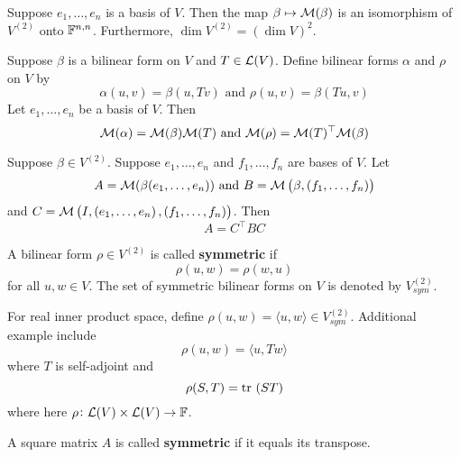 \documentclass{extarticle}
\begin{document}
\begin{corollary}[\(\dim V^{(2)} = \left( \dim V \right)^2\)]
    Suppose \(e_1, \ldots, e_n\) is a basis of \(V\). Then the map \(\beta \mapsto \mathcal{M}(\beta)\) is an 
    isomorphism of \(V^{(2)}\) onto \(\mathbb{F}^{n, n}\). Furthermore, \(\dim V^{(2)} = (\dim V)^2\). 
\end{corollary}

\begin{lemma}
    Suppose \(\beta\) is a bilinear form on \(V\) and \(T \in \mathcal{L}(V)\). Define bilinear forms 
    \(\alpha\) and \(\rho\) on \(V\) by 
    \[\alpha(u, v) = \beta(u, Tv) \text{  and  } \rho(u,v) = \beta(Tu, v)\]
    Let \(e_1, \ldots, e_n\) be a basis of \(V\). Then 
    \[\mathcal{M}(\alpha) = \mathcal{M}(\beta) \mathcal{M}(T) \text{  and  } \mathcal{M}(\rho) = \mathcal{M}(T)^\top \mathcal{M}(\beta)\]
\end{lemma}

\begin{thm}
    Suppose \(\beta \in V^{(2)}\). Suppose \(e_1, \ldots, e_n\) and \(f_1, \ldots, f_n\) are bases of \(V\). 
    Let 
    \[A = \mathcal{M}(\beta (e_1, \ldots, e_n)) \text{   and   } B = \mathcal{M} \left( \beta , \left( f_1, \ldots, f_n \right) \right)\]
    and \(C = \mathcal{M} \left( I, \left( e_1, \ldots, e_n \right), \left( f_1, \ldots, f_n \right) \right)\). Then 
    \[A = C^\top B C\]
\end{thm}

\begin{definition}
    A bilinear form \(\rho \in V^{(2)}\) is called \textbf{symmetric} if 
    \[\rho (u, w) = \rho (w, u)\]
    for all \(u, w \in V\). The set of symmetric bilinear forms on \(V\) is denoted by \(V_{sym}^{(2)}\).
\end{definition}

\begin{remark}
    For real inner product space, define \(\rho (u,w) = \langle u,w \rangle \in V_{sym}^{(2)}\). Additional 
    example include 
    \[\rho (u,w) = \langle u,Tw \rangle\]
    where \(T\) is self-adjoint and  
    \[\rho (S,T) = \tr \ (ST)\]
    where here \(\rho \colon \mathcal{L}(V) \times \mathcal{L}(V) \to \mathbb{F}\).
\end{remark}

\begin{definition}
    A square matrix \(A\) is called \textbf{symmetric} if it equals its transpose. 
\end{definition}
\end{document}
